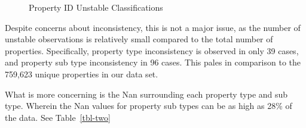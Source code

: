 \documentclass[
  12pt]{article}
\begin{document}
\begin{figure}


\caption{\label{fig-propertyid}Property ID Unstable Classifications}

\end{figure}%

Despite concerns about inconsistency, this is not a major issue, as the
number of unstable observations is relatively small compared to the
total number of properties. Specifically, property type inconsistency is
observed in only 39 cases, and property sub type inconsistency in 96
cases. This pales in comparison to the 759,623 unique properties in our
data set.

What is more concerning is the Nan surrounding each property type and
sub type. Wherein the Nan values for property sub types can be as high
as 28\% of the data. See Table~\ref{tbl-two}
\end{document}
